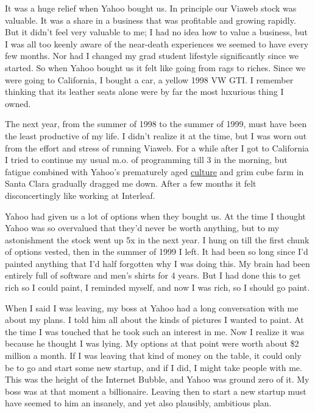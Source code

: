 It was a huge relief when Yahoo bought us. In principle our Viaweb stock
was valuable. It was a share in a business that was profitable and
growing rapidly. But it didn't feel very valuable to me; I had no idea
how to value a business, but I was all too keenly aware of the
near-death experiences we seemed to have every few months. Nor had I
changed my grad student lifestyle significantly since we started. So
when Yahoo bought us it felt like going from rags to riches. Since we
were going to California, I bought a car, a yellow 1998 VW GTI. I
remember thinking that its leather seats alone were by far the most
luxurious thing I owned.

The next year, from the summer of 1998 to the summer of 1999, must have
been the least productive of my life. I didn't realize it at the time,
but I was worn out from the effort and stress of running Viaweb. For a
while after I got to California I tried to continue my usual m.o. of
programming till 3 in the morning, but fatigue combined with Yahoo's
prematurely aged \href{yahoo.html}{culture} and grim cube farm in Santa
Clara gradually dragged me down. After a few months it felt
disconcertingly like working at Interleaf.

Yahoo had given us a lot of options when they bought us. At the time I
thought Yahoo was so overvalued that they'd never be worth anything, but
to my astonishment the stock went up 5x in the next year. I hung on till
the first chunk of options vested, then in the summer of 1999 I left. It
had been so long since I'd painted anything that I'd half forgotten why
I was doing this. My brain had been entirely full of software and men's
shirts for 4 years. But I had done this to get rich so I could paint, I
reminded myself, and now I was rich, so I should go paint.

When I said I was leaving, my boss at Yahoo had a long conversation with
me about my plans. I told him all about the kinds of pictures I wanted
to paint. At the time I was touched that he took such an interest in me.
Now I realize it was because he thought I was lying. My options at that
point were worth about \$2 million a month. If I was leaving that kind
of money on the table, it could only be to go and start some new
startup, and if I did, I might take people with me. This was the height
of the Internet Bubble, and Yahoo was ground zero of it. My boss was at
that moment a billionaire. Leaving then to start a new startup must have
seemed to him an insanely, and yet also plausibly, ambitious plan.

